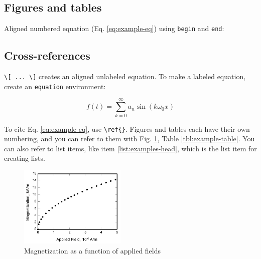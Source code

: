 \subsection*{Figures and tables}
Aligned numbered equation (Eq. \ref{eq:example-eq}) using \verb|begin| and \verb|end|:

\subsection*{Cross-references}

\verb|\[ ... \]| creates an aligned unlabeled equation. To make a labeled equation, create an \verb|equation| environment: 

\begin{equation} \label{eq:example-eq}
    f(t) = \sum_{k = 0}^{\infty} a_{n} \sin(k\omega_{0}x)
\end{equation}

To cite Eq. \ref{eq:example-eq}, use \verb|\ref{}|. Figures and tables each have
their own numbering, and you can refer to them with  Fig. \ref{fig:example-fig},
Table \ref{tbl:example-table}. You can also refer to list items, like item
\ref{list:examples-head}, which is the list item for creating lists.


\begin{figure}[H]
    \centering
    \includegraphics[width=2in]{fig/graph.jpg} %
    \caption{Magnetization as a function of applied fields} 
    \label{fig:example-fig} %
\end{figure}

